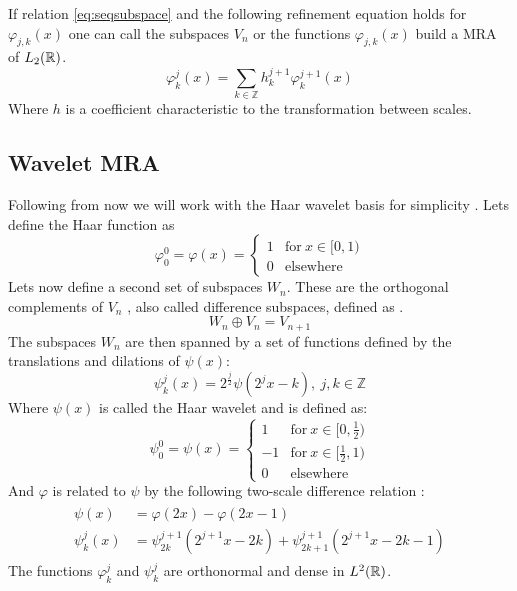 \documentclass[../master_thesis.tex]{subfiles}
\begin{document}
If relation \ref{eq:seqsubspace} and the following refinement equation holds for $\varphi_{j,k}(x)$
one can call the subspaces $V_n$ or the functions $\varphi_{j,k}(x)$ build a \ac{MRA} of $L_2(\mathbb{R})$.
\begin{equation}
\varphi^j_k(x) = \sum_{k\in\mathbb{Z}} h^{j+1}_k\varphi^{j+1}_k(x)
\end{equation}
Where $h$ is a coefficient characteristic to the transformation between scales.
\subsection{Wavelet \ac{MRA}}
Following from now we will work with the Haar wavelet basis for simplicity \cite{Beylkin:MRA}.
Lets define the Haar function \cite{Schneider:2007} as
\begin{equation}
  \varphi^0_0 = \varphi(x) =
  \begin{cases}
  1 & \text{for} \ x\in [0,1)\\
  0 & \text{elsewhere}
\end{cases}
\end{equation}
Lets now define a second set of subspaces $W_n$. These are the orthogonal complements of $V_n$ \cite{Alpert1993}, also called difference subspaces,
defined as \cite{Beylkin:MRA, Sorland, Alpert1993}.
\begin{equation}
  W_n \oplus V_n = V_{n + 1} \label{eq:diffsubspace}
\end{equation}
The subspaces $W_n$ are then spanned by a set of functions defined by the translations and
dilations of $\psi(x)$:
\begin{equation}
  \psi_k^j(x) = 2^{\frac{j}{2}}\psi(2^jx - k),\  j,k \in \mathbb{Z} \label{eq:haarwavelet}
\end{equation}
Where $\psi(x)$ is called the Haar wavelet \cite{Schneider:2007} and is defined as:
\begin{equation}
  \psi^0_0 = \psi(x) =
  \begin{cases}
  1 & \text{for} \ x\in [0,\frac{1}{2})\\
  -1 & \text{for}\ x\in [\frac{1}{2}, 1)\\
  0 & \text{elsewhere}
\end{cases}
\end{equation}
And $ \varphi$ is related to $\psi$ by the following two-scale difference relation \cite{Beylkin:MRA, Schneider:2007, Sorland}:
\begin{align}
  \begin{split}\label{eq:2scalewavelet}
    \psi(x) &= \varphi(2x) - \varphi(2x - 1)\\
    \psi^j_k(x) &= \psi^{j+1}_{2k}(2^{j+1}x - 2k) + \psi^{j+1}_{2k+1}(2^{j+1}x - 2k - 1)
  \end{split}
\end{align}
The functions $\varphi^j_k$ and $\psi^j_k$ are orthonormal
and dense \cite{Beylkin:MRA, Sorland, SRJensen:2014} in $L^2(\mathbb{R})$.
\end{document}
